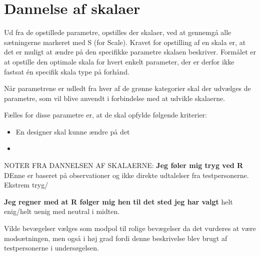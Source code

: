 \section{Dannelse af skalaer}
\label{ParametreDatabehandlingSkalaer}
%
Ud fra de opstillede parametre, opstilles der skalaer, ved at gennemgå alle sætningerne markeret med S (for Scale). Kravet for opstilling af en skala er, at det er muligt at ændre på den specifikke parametre skalaen beskriver. Formålet er at opstille den optimale skala for hvert enkelt parameter, der er derfor ikke fastsat én specifik skala type på forhånd. 


Når parametrene er udledt fra hver af de grønne kategorier skal der udvælges de parametre, som vil blive anvendt i forbindelse med at udvikle skalaerne. 

Fælles for disse parametre er, at de skal opfylde følgende kriterier: \blankline
%
\begin{itemize}
  \item En designer skal kunne ændre på det
  \item 
\end{itemize}



NOTER FRA DANNELSEN AF SKALAERNE:
\textbf{Jeg føler mig tryg ved R}
DEnne er baseret på observationer og ikke direkte udtalelser fra testpersonerne. 
Ekstrem tryg/

\textbf{Jeg regner med at R følger mig hen til det sted jeg har valgt} 
helt enig/helt uenig med neutral i midten. 

Vilde bevægelser vælges som modpol til rolige bevægelser da det vurderes at være modsætningen, men også i høj grad fordi denne beskrivelse blev brugt af testpersonerne i undersøgelsen. 

